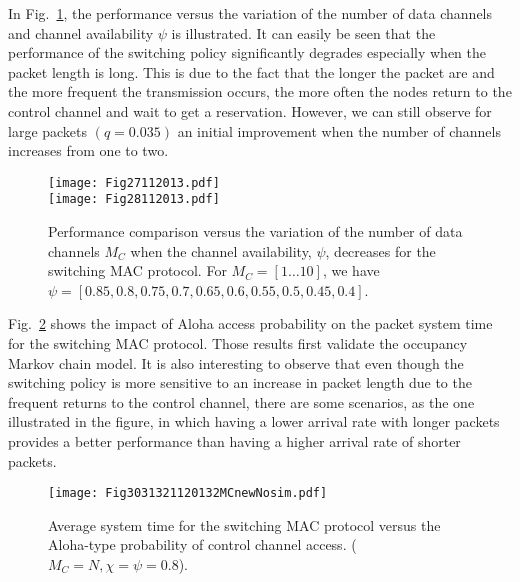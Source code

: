 \documentclass[12pt,journal,oneside,onecolumn]{IEEEtran}
\begin{document}
In Fig.~\ref{Fig2728112013}, the performance versus 
the variation of the number of data channels and channel availability $\psi$
is illustrated. It can easily be 
seen that the performance of the switching policy 
significantly degrades especially when the packet length 
is long. This is due to the fact that the longer the packet are and the more frequent the transmission
occurs, the more often the nodes return to the control channel and wait to get a reservation.
However, we can still observe for large packets $(q=0.035)$ an initial 
improvement when the number of channels increases 
from one to two.
\begin{figure}\centering
\texttt{[image: Fig27112013.pdf]}\\
\texttt{[image: Fig28112013.pdf]}\caption{Performance comparison versus the variation of the number of data channels $M_C$ when the channel availability, $\psi$, decreases for the switching MAC protocol.
For $M_C=[1\dots 10]$, we have $\psi=[0.85, 0.8, 0.75, 0.7, 0.65, 0.6, 0.55, 0.5, 0.45, 0.4]$.}\label{Fig2728112013}
\end{figure}

Fig.~\ref{Fig303132112013.pdf}  shows the impact of Aloha access probability on the packet system time 
for the switching MAC protocol. Those results first
validate the occupancy Markov chain model.
It is also interesting to observe that even though the switching policy 
is more sensitive to an increase in packet length due to the frequent returns to the control channel, 
there are some scenarios, as the one illustrated in the figure, in which having a lower arrival rate with longer packets provides
a better performance than having a higher arrival rate of shorter packets. 
\begin{figure}\texttt{[image: Fig3031321120132MCnewNosim.pdf]}\caption{Average system time for the switching MAC protocol versus the Aloha-type probability of control channel access. ($M_C=N, \chi=\psi=0.8$).}\label{Fig303132112013.pdf}\end{figure}
\end{document}
